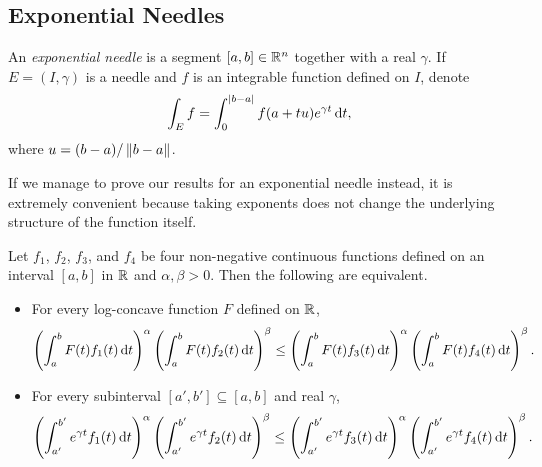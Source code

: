 \documentclass{article}
\begin{document}
	\subsection{Exponential Needles}
	\label{sec: 5.1.3}

		\begin{definition}
			An \textit{exponential needle} is a segment $[a,b]\in\mathbb{R}^n$ together with a real $\gamma$. If $E=(I,\gamma)$ is a needle and $f$ is an integrable function defined on $I$, denote
			\[ \int_E f = \int_{0}^{|b-a|} f(a+tu)e^{\gamma t} \operatorname{d}\!{t}, \]
			where $u=(b-a)/\left\lVert b-a\right\rVert$.
		\end{definition}

		If we manage to prove our results for an exponential needle instead, it is extremely convenient because taking exponents does not change the underlying structure of the function itself.

		\begin{lemma}
			\label{localized exponential needle interconversion}
			Let $f_1$, $f_2$, $f_3$, and $f_4$ be four non-negative continuous functions defined on an interval $[a,b]$ in $\mathbb{R}$ and $\alpha,\beta>0$. Then the following are equivalent.
			\begin{itemize}
				\item For every log-concave function $F$ defined on $\mathbb{R}$, 
				\[ \left(\int_a^b F(t)f_1(t)\operatorname{d}\!{t}\right)^\alpha \left(\int_a^b F(t)f_2(t)\operatorname{d}\!{t}\right)^\beta \leq \left(\int_a^b F(t)f_3(t)\operatorname{d}\!{t}\right)^\alpha \left(\int_a^b F(t)f_4(t)\operatorname{d}\!{t}\right)^\beta. \]

				\item For every subinterval $[a',b']\subseteq[a,b]$ and real $\gamma$,
				\[ \left(\int_{a'}^{b'} e^{\gamma t}f_1(t)\operatorname{d}\!{t}\right)^\alpha \left(\int_{a'}^{b'} e^{\gamma t}f_2(t)\operatorname{d}\!{t}\right)^\beta \leq \left(\int_{a'}^{b'} e^{\gamma t}f_3(t)\operatorname{d}\!{t}\right)^\alpha \left(\int_{a'}^{b'} e^{\gamma t}f_4(t)\operatorname{d}\!{t}\right)^\beta. \]
			\end{itemize}
		\end{lemma}
\end{document}
